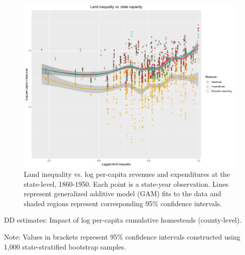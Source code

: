 \documentclass[12pt]{article}
\begin{document}
\begin{figure}[htbp]
	\begin{center}
		\includegraphics[width=1\textwidth]{plots/ineq-capacity.png} 
	\end{center}
	\caption{Land inequality vs. log per-capita revenues and expenditures at the state-level, 1860-1950. Each point is a state-year observation. Lines represent generalized additive model (GAM) fits to the data and shaded regions represent corresponding 95\% confidence intervals.   \label{fig:ineq-capacity}}
\end{figure} 

\begin{table}[htbp]
	\begin{center}
				\caption{DD estimates: Impact of log per-capita cumulative homesteads (county-level). \label{dd-mechanisms}}
		\resizebox{.8\width}{!}{}
\end{center}
	\footnotesize{Note: Values in brackets represent 95\% confidence intervals constructed using 1,000 state-stratified bootstrap samples.}
\end{table}

\pagebreak





\itemize
\end{document}
